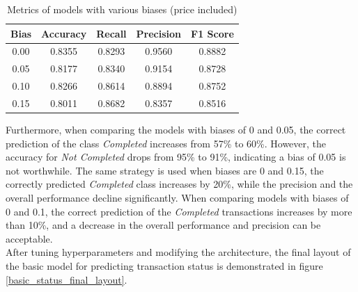 \documentclass[12pt,twoside]{report}
\begin{document}
\begin{table}[!htbp]
	\centering
	\caption{Metrics of models with various biases (price included)}
	\label{status_bias_metrics}
	\begin{tabular}{| c | c | c | c | c |}
		\hline
		Bias & Accuracy & Recall & Precision & F1 Score \\
		\hline
		0.00 & 0.8355 & 0.8293 & 0.9560 & 0.8882 \\
		\hline
		0.05 & 0.8177 & 0.8340 & 0.9154 & 0.8728 \\
		\hline
		0.10 & 0.8266 & 0.8614 & 0.8894 & 0.8752 \\
		\hline
		0.15 & 0.8011 & 0.8682 & 0.8357 & 0.8516 \\
		\hline
	\end{tabular}
\end{table}

Furthermore, when comparing the models with biases of 0 and 0.05, the correct prediction of the class \textit{Completed} increases from 57\% to 60\%. However, the accuracy for \textit{Not Completed} drops from 95\% to 91\%, indicating a bias of 0.05 is not worthwhile. The same strategy is used when biases are 0 and 0.15, the correctly predicted \textit{Completed} class increases by 20\%, while the precision and the overall performance decline significantly. When comparing models with biases of 0 and 0.1, the correct prediction of the \textit{Completed} transactions increases by more than 10\%, and a decrease in the overall performance and precision can be acceptable. 
\\

After tuning hyperparameters and modifying the architecture, the final layout of the basic model for predicting transaction status is demonstrated in figure \ref{basic_status_final_layout}. 
\end{document}
